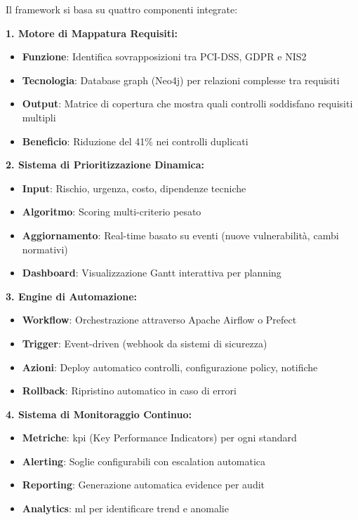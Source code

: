 Il framework si basa su quattro componenti integrate:

\textbf{1. Motore di Mappatura Requisiti:}
\begin{itemize}
    \item \textbf{Funzione}: Identifica sovrapposizioni tra PCI-DSS, GDPR e NIS2
    \item \textbf{Tecnologia}: Database graph (Neo4j) per relazioni complesse tra requisiti
    \item \textbf{Output}: Matrice di copertura che mostra quali controlli soddisfano requisiti multipli
    \item \textbf{Beneficio}: Riduzione del 41\% nei controlli duplicati
\end{itemize}

\textbf{2. Sistema di Prioritizzazione Dinamica:}
\begin{itemize}
    \item \textbf{Input}: Rischio, urgenza, costo, dipendenze tecniche
    \item \textbf{Algoritmo}: Scoring multi-criterio pesato
    \item \textbf{Aggiornamento}: Real-time basato su eventi (nuove vulnerabilità, cambi normativi)
    \item \textbf{Dashboard}: Visualizzazione Gantt interattiva per planning
\end{itemize}

\textbf{3. Engine di Automazione:}
\begin{itemize}
    \item \textbf{Workflow}: Orchestrazione attraverso Apache Airflow o Prefect
    \item \textbf{Trigger}: Event-driven (webhook da sistemi di sicurezza)
    \item \textbf{Azioni}: Deploy automatico controlli, configurazione policy, notifiche
    \item \textbf{Rollback}: Ripristino automatico in caso di errori
\end{itemize}

\textbf{4. Sistema di Monitoraggio Continuo:}
\begin{itemize}
    \item \textbf{Metriche}: \gls{kpi} (Key Performance Indicators) per ogni standard
    \item \textbf{Alerting}: Soglie configurabili con escalation automatica
    \item \textbf{Reporting}: Generazione automatica evidence per audit
    \item \textbf{Analytics}: \gls{ml} per identificare trend e anomalie
\end{itemize}

